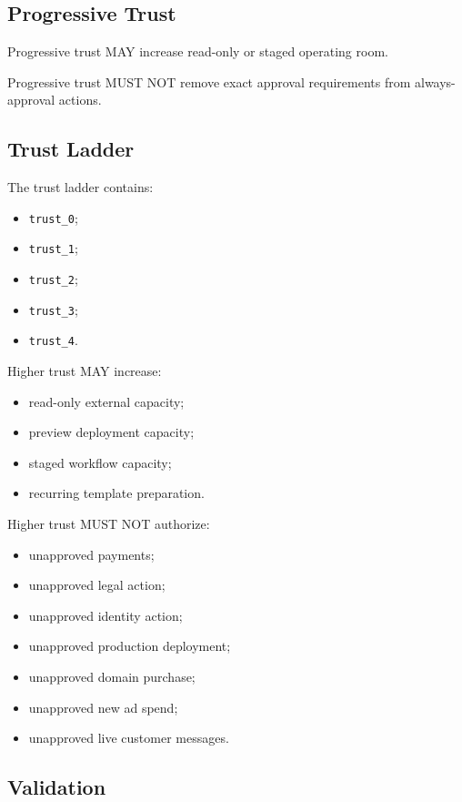 \subsection{Progressive Trust}

Progressive trust MAY increase read-only or staged operating room.

Progressive trust MUST NOT remove exact approval requirements from always-approval actions.

\subsection{Trust Ladder}

The trust ladder contains:

\begin{itemize}
  \item \texttt{trust\_0};
  \item \texttt{trust\_1};
  \item \texttt{trust\_2};
  \item \texttt{trust\_3};
  \item \texttt{trust\_4}.
\end{itemize}

Higher trust MAY increase:

\begin{itemize}
  \item read-only external capacity;
  \item preview deployment capacity;
  \item staged workflow capacity;
  \item recurring template preparation.
\end{itemize}

Higher trust MUST NOT authorize:

\begin{itemize}
  \item unapproved payments;
  \item unapproved legal action;
  \item unapproved identity action;
  \item unapproved production deployment;
  \item unapproved domain purchase;
  \item unapproved new ad spend;
  \item unapproved live customer messages.
\end{itemize}

\subsection{Validation}

